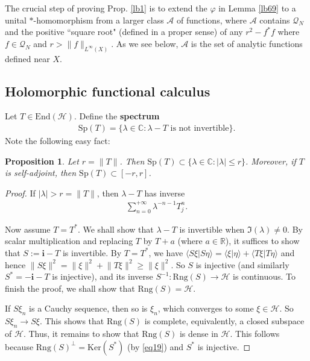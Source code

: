 \documentclass[12pt,a4paper,notitlepage]{article}
\theoremstyle{definition}
\theoremstyle{plain}
\newtheorem{pp}[df]{Proposition}
\newcommand{\mc}{\mathcal}
\newcommand{\End}{\mathrm{End}} %
\newcommand{\bk}[1]{\langle {#1}\rangle}
\newcommand{\im}{\mathbf{i}}
\newcommand{\Cbb}{\mathbb C}
\newcommand{\Rbb}{\mathbb R}
\newcommand{\Ker}{\mathrm{Ker}}
\newcommand{\Sp}{\mathrm{Sp}}
\newcommand{\Rng}{\mathrm{Rng}}
\numberwithin{equation}{section}
\begin{document}
The crucial step of proving Prop. \ref{lb1} is to extend the $\varphi$ in Lemma \ref{lb69} to a unital $*$-homomorphism from a larger class $\mc A$ of functions, where $\mc A$ contains  $\mc Q_N$ and the positive ``square root" (defined in a proper sense) of any $r^2-f^*f$ where $f\in\mc Q_N$ and $r>\lVert f\lVert_{L^\infty(X)}$. As we see below, $\mc A$ is the set of analytic functions defined near $X$.

\subsection*{Holomorphic functional calculus}

Let $T\in\End(\mc H)$. Define the \textbf{spectrum}
\begin{align}
	\Sp(T)=\{\lambda\in\Cbb:\lambda-T\text{ is not invertible}\}.	\label{eq23}
\end{align}
Note the following easy fact:

\begin{pp}
Let $r=\lVert T\lVert$. Then $\Sp(T)\subset \{\lambda\in\Cbb:|\lambda|\leq r\}$. Moreover, if $T$ is self-adjoint, then $\Sp(T)\subset[-r,r]$.
\end{pp}


\begin{proof}
If $|\lambda|>r=\lVert T\lVert$, then $\lambda-T$ has inverse
\begin{align}
\sum_{n=0}^{+\infty}\lambda^{-n-1}T_j^n.\label{eq20}
\end{align}

Now assume $T=T^*$. We shall show that $\lambda-T$ is invertible when $\Im(\lambda)\neq 0$. By scalar multiplication and replacing $T$ by $T+a$ (where $a\in\Rbb$), it suffices to show that $S:=\im-T$ is invertible. By $T=T^*$, we have $\bk{S\xi|S\eta}=\bk{\xi|\eta}+\bk{T\xi|T\eta}$ and hence $\lVert S\xi\lVert ^2=\lVert \xi\lVert^2+\lVert T\xi\lVert^2\geq \lVert \xi\lVert^2$. So $S$ is injective (and similarly $S^*=-\im-T$ is injective), and its inverse $S^{-1}:\Rng(S)\rightarrow\mc H$ is continuous. To finish the proof, we shall show that $\Rng(S)=\mc H$. 

If $S\xi_n$ is a Cauchy sequence, then so is $\xi_n$, which converges to some $\xi\in\mc H$. So $S\xi_n\rightarrow S\xi$. This shows that $\Rng(S)$ is complete, equivalently, a closed subspace of $\mc H$.  Thus, it remains to show that $\Rng(S)$ is dense in $\mc H$. This follows because $\Rng(S)^\perp=\Ker(S^*)$ (by \eqref{eq19}) and $S^*$ is injective.
\end{proof}
\end{document}

